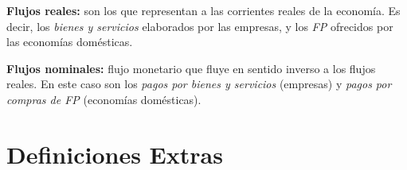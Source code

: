 \documentclass[10pt,a4paper]{article}
\begin{document}
\begin{description}
\item \textbf{Flujos reales:} son los que representan a las corrientes reales de la economía. Es decir, los \textit{bienes y servicios} elaborados por las empresas, y los \textit{FP} ofrecidos por las economías domésticas.
\item \textbf{Flujos nominales:} flujo monetario que fluye en sentido inverso a los flujos reales. En este caso son los \textit{pagos por bienes y servicios} (empresas) y \textit{pagos por compras de FP} (economías domésticas).
\end{description}

\section*{Definiciones Extras}
\end{document}
